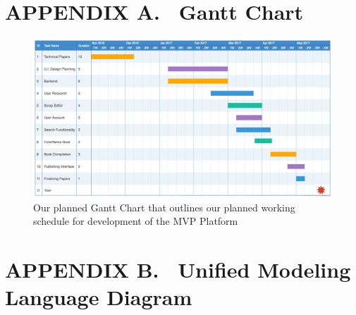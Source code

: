 \documentclass[onecolumn, draftclsnofoot,10pt, compsoc]{IEEEtran}
\begin{document}
{


\clearpage
\section[APPENDIX A. \ Gantt Chart]{
APPENDIX A. \ Gantt Chart}

\bigskip


\begin{figure}[ht!]
\centering
\includegraphics[width=160mm]{gantt_chart.png}
\caption{Our planned Gantt Chart that outlines our planned working schedule for development of the MVP Platform}
\end{figure}

\clearpage
\section[APPENDIX B. \ UML Diagram]{
APPENDIX B. \ Unified Modeling Language Diagram}

}
\end{document}
